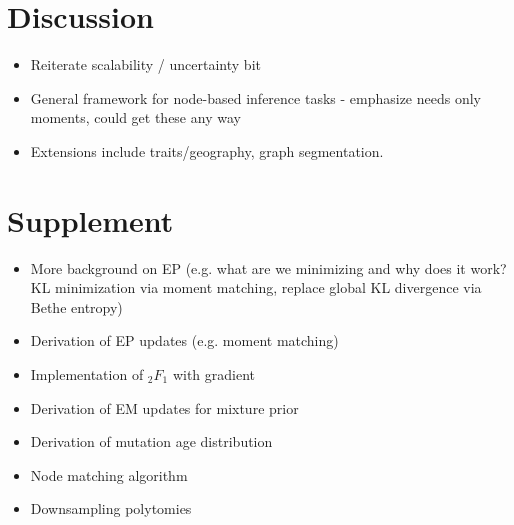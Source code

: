 \documentclass{article}
\begin{document}
\section{Discussion}
\begin{itemize}
\item Reiterate scalability / uncertainty bit
\item General framework for node-based inference tasks - emphasize needs only moments, could get these any way
\item Extensions include traits/geography, graph segmentation.
\end{itemize}

\section{Supplement}
\begin{itemize}
\item More background on EP (e.g. what are we minimizing and why does it work? KL minimization via moment matching, replace global KL divergence via Bethe entropy)
\item Derivation of EP updates (e.g. moment matching)
\item Implementation of ${_2}F_1$ with gradient
\item Derivation of EM updates for mixture prior
\item Derivation of mutation age distribution
\item Node matching algorithm
\item Downsampling polytomies
\end{itemize}
\end{document}
